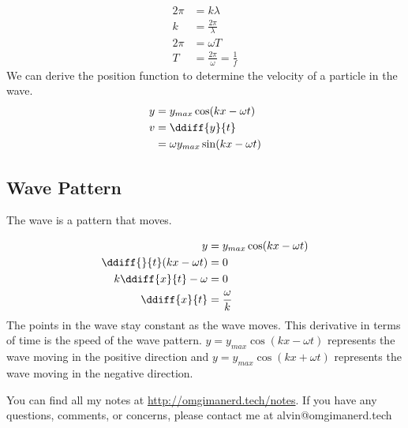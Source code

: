 \documentclass{math}
\begin{document}
\begin{align*}
  2\pi &= k\lambda \\
  k &= \frac{2\pi}{\lambda} \\
  2\pi &= \omega T \\
  T &= \frac{2\pi}{\omega} = \frac{1}{f}
\end{align*}
We can derive the position function to determine the velocity of a particle in
the wave.
\begin{align*}
  y &= y_{max}\cos(kx-\omega t) \\
  v &= \ddiff{y}{t} \\
  &= \omega y_{max}\sin(kx-\omega t)
\end{align*}

\subsection*{Wave Pattern}
The wave is a pattern that moves.
\begin{center}
\end{center}
\begin{align*}
  y &= y_{max}\cos(kx-\omega t) \\
  \ddiff{}{t}(kx-\omega t) &= 0 \\
  k\ddiff{x}{t}-\omega &= 0 \\
  \ddiff{x}{t} &= \frac{\omega}{k}
\end{align*}
The points in the wave stay constant as the wave moves. This derivative in terms
of time is the speed of the wave pattern. \( y = y_{max}\cos(kx-\omega t) \)
represents the wave moving in the positive direction and \( y =
y_{max}\cos(kx+\omega t) \) represents the wave moving in the negative
direction.

\begin{center}
  You can find all my notes at \url{http://omgimanerd.tech/notes}. If you have
  any questions, comments, or concerns, please contact me at
  alvin@omgimanerd.tech
\end{center}
\end{document}
